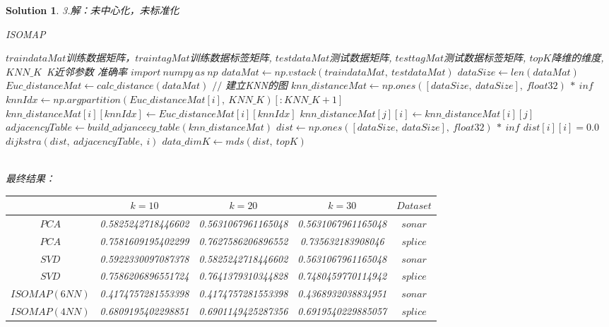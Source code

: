 \documentclass[a4paper,UTF8]{article}
\numberwithin{equation}{section}
\newtheorem*{solution}{Solution}
\begin{document}
\begin{solution}
\newpage
\noindent
3.解：未中心化，未标准化
\begin{algorithm}
	\caption{ISOMAP}
	\begin{algorithmic}[1]
		\Require $traindataMat$训练数据矩阵，$traintagMat$训练数据标签矩阵, $testdataMat$测试数据矩阵, $testtagMat$测试数据标签矩阵, $topK$降维的维度, $KNN\_K$\ K近邻参数
		\Ensure 准确率
		\State $import\ numpy\ as\ np$
		\State $dataMat \gets np.vstack(traindataMat,\ testdataMat)$
		\State $dataSize \gets len(dataMat)$
		\State $Euc\_distanceMat \gets calc\_distance(dataMat)$
		\State $//$ 建立KNN的图
		\State $knn\_distanceMat \gets np.ones([dataSize,\ dataSize],\ float32)\ *\ inf$
			\State $knnIdx \gets np.argpartition(Euc\_distanceMat[i],\ KNN\_K)[:KNN\_K + 1]$
			\State $knn\_distanceMat[i][knnIdx] \gets Euc\_distanceMat[i][knnIdx]$
				\State $knn\_distanceMat[j][i] \gets knn\_distanceMat[i][j]$
			\EndFor
		\EndFor
		\State $adjacencyTable \gets build\_adjancecy\_table(knn\_distanceMat)$
		\State $dist \gets np.ones([dataSize,\ dataSize],\ float32)\ *\ inf$
			\State $dist[i][i] = 0.0$
			\State $dijkstra(dist,\ adjacencyTable,\ i)$
		\EndFor
		\State $data\_dimK \gets mds(dist,\ topK)$
		\State {}
	\end{algorithmic}
\end{algorithm}\\

\newpage
\noindent
最终结果：
\begin{table}[!htbp] 
	\centering \begin{tabular}{|c|c|c|c|c|} 
	\hline 
	\diagbox{$Method$}{$Accuracy$}{$Dim$}&$k=10$&$k=20$&$k=30$&$Dataset$\\
	\hline $PCA$&0.5825242718446602&0.5631067961165048&0.5631067961165048&$sonar$\\ 
	\hline $PCA$&0.7581609195402299&0.7627586206896552&0.735632183908046&$splice$\\ 
	\hline $SVD$&0.5922330097087378&0.5825242718446602&0.5631067961165048&$sonar$\\ 
	\hline $SVD$&0.7586206896551724&0.7641379310344828&0.7480459770114942&$splice$\\ 
	\hline $ISOMAP(6NN)$&0.4174757281553398&0.4174757281553398&0.4368932038834951&$sonar$\\ 
	\hline $ISOMAP(4NN)$&0.6809195402298851&0.6901149425287356&0.6919540229885057&$splice$\\ 
	\hline 
	\end{tabular} 
\end{table}
\end{solution}
\newpage 
\end{document}
